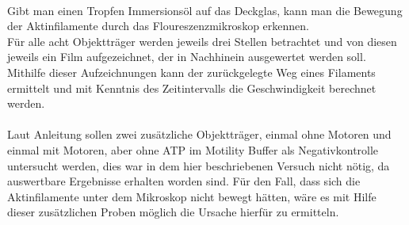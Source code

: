 \\
Gibt man einen Tropfen Immersionsöl auf das Deckglas, kann man die Bewegung der Aktinfilamente durch das Floureszenzmikroskop erkennen.\\
Für alle acht Objektträger werden jeweils drei Stellen betrachtet und von diesen jeweils ein Film aufgezeichnet, der in Nachhinein ausgewertet werden soll. Mithilfe dieser Aufzeichnungen kann der zurückgelegte Weg eines Filaments ermittelt und mit Kenntnis des Zeitintervalls die Geschwindigkeit berechnet werden.\\
\\
Laut Anleitung sollen zwei zusätzliche Objektträger, einmal ohne Motoren und einmal mit Motoren, aber ohne ATP im Motility Buffer als Negativkontrolle untersucht werden, dies war in dem hier beschriebenen Versuch nicht nötig, da auswertbare Ergebnisse erhalten worden sind. Für den Fall, dass sich die Aktinfilamente unter dem Mikroskop nicht bewegt hätten, wäre es mit Hilfe dieser zusätzlichen Proben möglich die Ursache hierfür zu ermitteln.